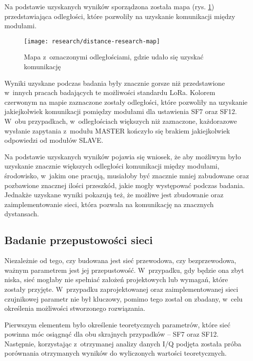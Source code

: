 Na podstawie uzyskanych wyników sporządzona została mapa (rys. \ref{img:distance-research-map}) przedstawiająca
odległości, które pozwoliły na uzyskanie komunikacji między modułami.

\begin{figure}[!htbp]
    \centering
    \texttt{[image: research/distance-research-map]}
    \caption{\label{img:distance-research-map}Mapa z~oznaczonymi odległościami, gdzie udało się uzyskać komunikację}
\end{figure}

\FloatBarrier
Wyniki uzyskane podczas badania były znacznie gorsze niż przedstawione w~innych pracach badających te możliwości
standardu LoRa. Kolorem czerwonym na mapie zaznaczone zostały odległości, które pozwoliły na uzyskanie jakiejkolwiek
komunikacji pomiędzy modułami dla ustawienia SF7 oraz SF12. W~obu przypadkach, w~odległościach większych niż zaznaczone,
każdorazowe wysłanie zapytania z~modułu MASTER kończyło się brakiem jakiejkolwiek odpowiedzi od modułów SLAVE.

Na podstawie uzyskanych wyników pojawia się wniosek, że aby możliwym było uzyskanie znacznie większych odległości
komunikacji między modułami, środowisko, w~jakim one pracują, musiałoby być znacznie mniej zabudowane oraz pozbawione
znacznej ilości przeszkód, jakie mogły występować podczas badania. Jednakże uzyskane wyniki pokazują też, że możliwe
jest zbudowanie oraz zaimplementowanie sieci, która pozwala na komunikację na znacznych dystansach.

\subsection{\label{sect:network-communication-bitrate}Badanie przepustowości sieci} Niezależnie od tego, czy budowana
jest sieć przewodowa, czy bezprzewodowa, ważnym parametrem jest jej przepustowość. W~przypadku, gdy będzie ona zbyt
niska, sieć mogłaby nie spełniać założeń projektowych lub wymagań, które zostały przyjęte. W~przypadku zaprojektowanej
oraz zaimplementowanej sieci czujnikowej parametr nie był kluczowy, pomimo tego został on zbadany, w~celu określenia
możliwości stworzonego rozwiązania.

Pierwszym elementem było określenie teoretycznych parametrów, które sieć powinna móc osiągnąć dla obu skrajnych
przypadków -- SF7 oraz SF12. Następnie, korzystając z~otrzymanej analizy danych I/Q podjęta została próba porównania
otrzymanych wyników do wyliczonych wartości teoretycznych.


